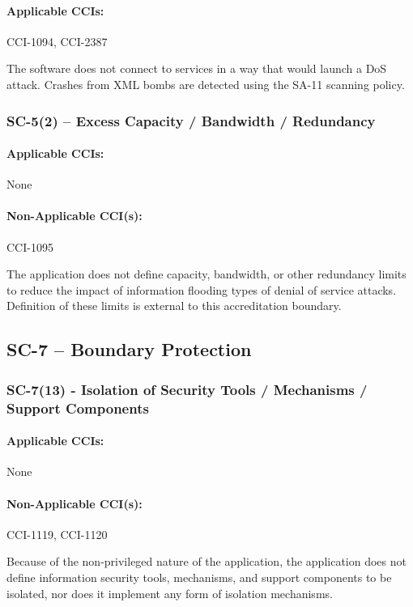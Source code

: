 \documentclass[letterpaper, 10pt, twoside]{article}
\begin{document}
\paragraph{Applicable CCIs:} CCI-1094, CCI-2387

The software does not connect to services in a way that would launch a DoS attack. Crashes from XML bombs are detected using the SA-11 scanning policy.

\subsubsection{SC-5(2) -- Excess Capacity / Bandwidth / Redundancy}

\paragraph{Applicable CCIs:} None

\paragraph{Non-Applicable CCI(s):} CCI-1095

The application does not define capacity, bandwidth, or other redundancy limits to reduce the impact of information flooding types of denial of service attacks. Definition of these limits is external to this accreditation boundary.

\subsection{SC-7 -- Boundary Protection}

\subsubsection{SC-7(13) - Isolation of Security Tools / Mechanisms / Support Components}

\paragraph{Applicable CCIs:} None

\paragraph{Non-Applicable CCI(s):} CCI-1119, CCI-1120

Because of the non-privileged nature of the application, the application does not define information security tools, mechanisms, and support components to be isolated, nor does it implement any form of isolation mechanisms.
\end{document}

